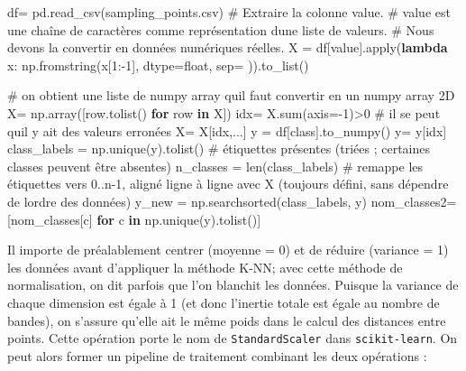 \documentclass[
  french,
  11pt,
  letterpaper,
  open=any,
  twoside=false,
  french]{scrbook}
\newenvironment{Shaded}{\begin{snugshade}}{\end{snugshade}}
\newcommand{\BuiltInTok}[1]{\textcolor[rgb]{0.00,0.23,0.31}{#1}}
\newcommand{\CommentTok}[1]{\textcolor[rgb]{0.37,0.37,0.37}{#1}}
\newcommand{\ControlFlowTok}[1]{\textcolor[rgb]{0.00,0.23,0.31}{\textbf{#1}}}
\newcommand{\DecValTok}[1]{\textcolor[rgb]{0.68,0.00,0.00}{#1}}
\newcommand{\KeywordTok}[1]{\textcolor[rgb]{0.00,0.23,0.31}{\textbf{#1}}}
\newcommand{\NormalTok}[1]{\textcolor[rgb]{0.00,0.23,0.31}{#1}}
\newcommand{\OperatorTok}[1]{\textcolor[rgb]{0.37,0.37,0.37}{#1}}
\newcommand{\StringTok}[1]{\textcolor[rgb]{0.13,0.47,0.30}{#1}}
\begin{document}
\begin{Shaded}
\begin{Highlighting}[]
\NormalTok{df}\OperatorTok{=}\NormalTok{ pd.read\_csv(}\StringTok{\textquotesingle{}sampling\_points.csv\textquotesingle{}}\NormalTok{)}
\CommentTok{\# Extraire la colonne \textquotesingle{}value\textquotesingle{}.}
\CommentTok{\# \textquotesingle{}value\textquotesingle{} est une chaîne de caractères comme représentation d\textquotesingle{}une liste de valeurs.}
\CommentTok{\# Nous devons la convertir en données numériques réelles.}
\NormalTok{X }\OperatorTok{=}\NormalTok{ df[}\StringTok{\textquotesingle{}value\textquotesingle{}}\NormalTok{].}\BuiltInTok{apply}\NormalTok{(}\KeywordTok{lambda}\NormalTok{ x: np.fromstring(x[}\DecValTok{1}\NormalTok{:}\OperatorTok{{-}}\DecValTok{1}\NormalTok{], dtype}\OperatorTok{=}\BuiltInTok{float}\NormalTok{, sep}\OperatorTok{=}\StringTok{\textquotesingle{} \textquotesingle{}}\NormalTok{)).to\_list()}

\CommentTok{\# on obtient une liste de numpy array  qu\textquotesingle{}il faut convertir en un numpy array 2D}
\NormalTok{X}\OperatorTok{=}\NormalTok{ np.array([row.tolist() }\ControlFlowTok{for}\NormalTok{ row }\KeywordTok{in}\NormalTok{ X])}
\NormalTok{idx}\OperatorTok{=}\NormalTok{ X.}\BuiltInTok{sum}\NormalTok{(axis}\OperatorTok{={-}}\DecValTok{1}\NormalTok{)}\OperatorTok{\textgreater{}}\DecValTok{0} \CommentTok{\# il se peut qu\textquotesingle{}il y ait des valeurs erronées}
\NormalTok{X}\OperatorTok{=}\NormalTok{ X[idx,...]}
\NormalTok{y }\OperatorTok{=}\NormalTok{ df[}\StringTok{\textquotesingle{}class\textquotesingle{}}\NormalTok{].to\_numpy()}
\NormalTok{y}\OperatorTok{=}\NormalTok{ y[idx]}
\NormalTok{class\_labels }\OperatorTok{=}\NormalTok{ np.unique(y).tolist() }\CommentTok{\# étiquettes présentes (triées ; certaines classes peuvent être absentes)}
\NormalTok{n\_classes }\OperatorTok{=} \BuiltInTok{len}\NormalTok{(class\_labels)}
\CommentTok{\# remappe les étiquettes vers 0..n{-}1, aligné ligne à ligne avec X (toujours défini, sans dépendre de l\textquotesingle{}ordre des données)}
\NormalTok{y\_new }\OperatorTok{=}\NormalTok{ np.searchsorted(class\_labels, y)}
\NormalTok{nom\_classes2}\OperatorTok{=}\NormalTok{ [nom\_classes[c] }\ControlFlowTok{for}\NormalTok{ c }\KeywordTok{in}\NormalTok{ np.unique(y).tolist()]}
\end{Highlighting}
\end{Shaded}

Il importe de préalablement centrer (moyenne = 0) et de réduire
(variance = 1) les données avant d'appliquer la méthode K-NN; avec cette
méthode de normalisation, on dit parfois que l'on blanchit les données.
Puisque la variance de chaque dimension est égale à 1 (et donc l'inertie
totale est égale au nombre de bandes), on s'assure qu'elle ait le même
poids dans le calcul des distances entre points. Cette opération porte
le nom de \texttt{StandardScaler} dans \texttt{scikit-learn}. On peut
alors former un pipeline de traitement combinant les deux opérations :
\end{document}

